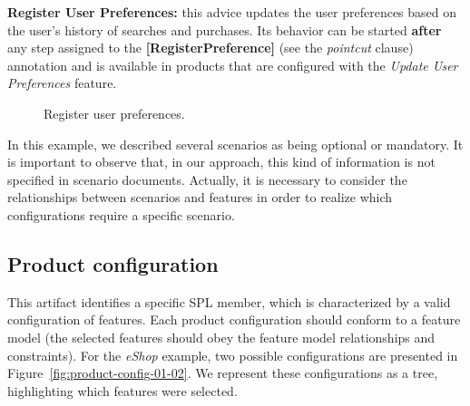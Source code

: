 \documentclass{acm_proc_article-sp}
\begin{document}
{\bf Register User Preferences:} this advice updates the user preferences based
on the user's history of searches and purchases. Its behavior can be started {\bf
after} any step assigned to the {\bf [RegisterPreference]} (see the
\emph{pointcut} clause) annotation and is available in products that are
configured with the \emph{Update User Preferences} feature.

\begin{figure}[h]
\caption{Register user preferences.}
\label{fig:register-preferences-flow}
\end{figure}

In this example, we described several scenarios as being optional or
mandatory. It is important to observe that, in our approach, this kind of
information is not specified in scenario documents. Actually, it is necessary to
consider the relationships between scenarios and features in order to realize
which configurations require a specific scenario.



\subsection{Product configuration}\label{subsub:pc}

This artifact identifies a specific SPL member, which is characterized by a valid
configuration of features. Each product configuration should conform to a feature
model (the selected features should obey the feature model relationships and
constraints). For the \emph{eShop} example, two possible configurations are
presented in Figure~\ref{fig:product-config-01-02}. We represent these configurations as a
tree, highlighting which features were selected.
\end{document}
